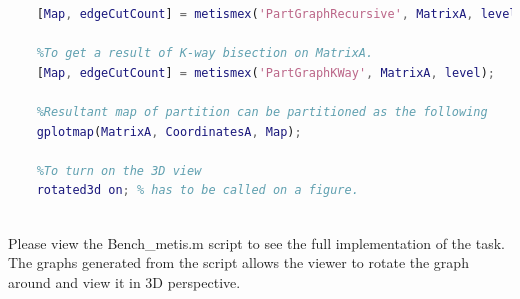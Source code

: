 \documentclass[unicode,11pt,a4paper,oneside,numbers=endperiod,openany]{scrartcl}
\begin{document}
\newpage
 \begin{lstlisting}[language=Matlab]
    %To get a result of recursive bisection on MatrixA.
    [Map, edgeCutCount] = metismex('PartGraphRecursive', MatrixA, level);
    
    %To get a result of K-way bisection on MatrixA.
    [Map, edgeCutCount] = metismex('PartGraphKWay', MatrixA, level);
    
    %Resultant map of partition can be partitioned as the following
    gplotmap(MatrixA, CoordinatesA, Map);
    
    %To turn on the 3D view
    rotated3d on; % has to be called on a figure.
  
 \end{lstlisting}
{
 
 Please view the Bench\_metis.m script to see the full implementation of the task. The graphs generated from the script allows the viewer to rotate the graph around and view it in 3D perspective.
}
\end{document}
